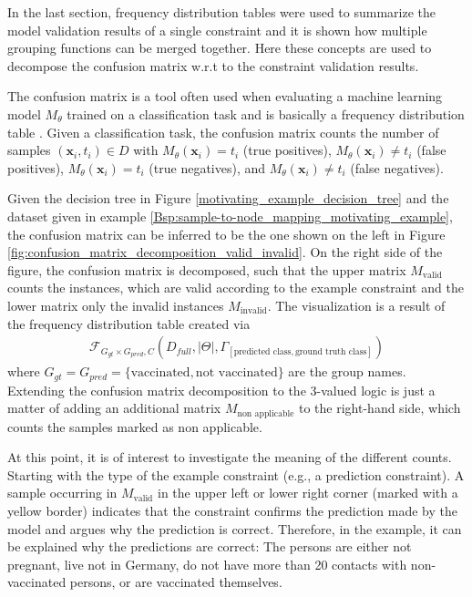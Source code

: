 In the last section, frequency distribution tables were used to summarize the model validation results of a single constraint and it is shown how multiple grouping functions can be merged together. Here these concepts are used to decompose the confusion matrix w.r.t to the constraint validation results. 

The confusion matrix is a tool often used when evaluating a machine learning model $M_\theta$ trained on a classification task and is basically a frequency distribution table \cite{fawcett2006introduction}. Given a classification task, the confusion matrix counts the number of samples $(\mathbf{x}_i, t_i) \in D$ with $M_\theta(\mathbf{x}_i) = t_i$ (true positives), $M_\theta(\mathbf{x}_i) \neq t_i$ (false positives), $M_\theta(\mathbf{x}_i) = t_i$ (true negatives), and $M_\theta(\mathbf{x}_i) \neq t_i$ (false negatives).

Given the decision tree in Figure \ref{motivating_example_decision_tree} and the dataset given in example \ref{Bsp:sample-to-node_mapping_motivating_example}, the confusion matrix can be inferred to be the one shown on the left in Figure \ref{fig:confusion_matrix_decomposition_valid_invalid}. On the right side of the figure, the confusion matrix is decomposed, such that the upper matrix $M_\text{valid}$ counts the instances, which are valid according to the example constraint and the lower matrix only the invalid instances $M_\text{invalid}$.
The visualization is a result of the frequency distribution table created via
\begin{gather*}
    \mathcal{F}_{G_{gt} \times G_{pred},C}(D_{full},|\Theta|, \Gamma_{[\text{predicted class}, \text{ground truth class}]})
\end{gather*}
where $G_{gt} = G_{pred} = \{\text{vaccinated}, \text{not vaccinated}\}$ are the group names. Extending the confusion matrix decomposition to the 3-valued logic is just a matter of adding an additional matrix $M_\text{non applicable}$ to the right-hand side, which counts the samples marked as non applicable.

At this point, it is of interest to investigate the meaning of the different counts. Starting with the type of the example constraint (e.g., a prediction constraint). A sample occurring in $M_\text{valid}$ in the upper left or lower right corner (marked with a yellow border) indicates that the constraint confirms the prediction made by the model and argues why the prediction is correct. Therefore, in the example, it can be explained why the predictions are correct: The persons are either not pregnant, live not in Germany, do not have more than 20 contacts with non-vaccinated persons, or are vaccinated themselves. 


